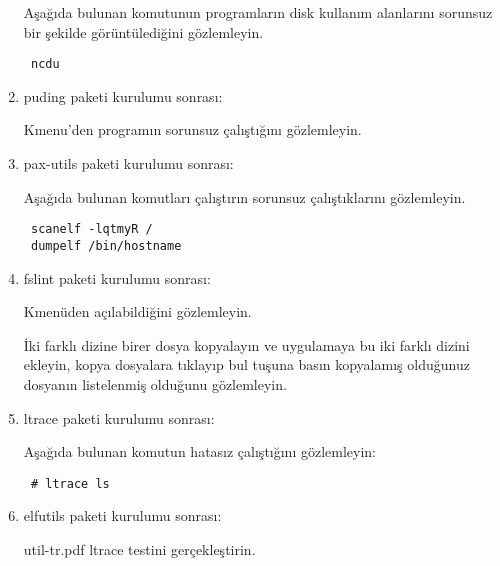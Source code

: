 \documentclass[a4paper,10pt]{article}
\begin{document}
\begin{enumerate}
Aşağıda bulunan komutunun programların disk kullanım alanlarını sorunsuz bir şekilde görüntülediğini gözlemleyin.
\begin{verbatim}
 ncdu 
\end{verbatim}


\item puding paketi kurulumu sonrası:

Kmenu'den programın sorunsuz çalıştığını gözlemleyin.

\item pax-utils paketi kurulumu sonrası:

Aşağıda bulunan komutları çalıştırın sorunsuz çalıştıklarını gözlemleyin.
\begin{verbatim}
 scanelf -lqtmyR /
 dumpelf /bin/hostname
\end{verbatim}

 \item fslint paketi kurulumu sonrası:

Kmenüden açılabildiğini gözlemleyin.

İki farklı dizine birer dosya kopyalayın ve uygulamaya bu iki farklı dizini ekleyin, kopya dosyalara tıklayıp bul tuşuna basın kopyalamış olduğunuz dosyanın listelenmiş olduğunu gözlemleyin.
 \item ltrace paketi kurulumu sonrası:

Aşağıda bulunan komutun hatasız çalıştığını gözlemleyin:
\begin{verbatim}
 # ltrace ls
\end{verbatim}
\item elfutils paketi kurulumu sonrası:

util-tr.pdf ltrace testini gerçekleştirin.
\end{enumerate}
\end{document}
